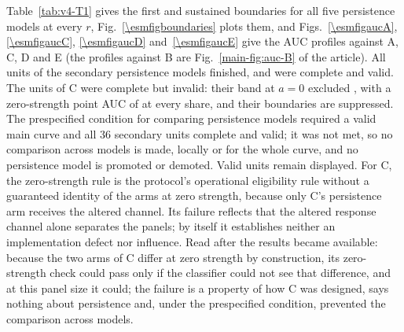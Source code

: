Table~\ref{tab:v4-T1} gives the first and sustained boundaries for all five persistence models at every $r$, Fig.~\ref{\esmfigboundaries} plots them, and Figs.~\ref{\esmfigaucA}, \ref{\esmfigaucC}, \ref{\esmfigaucD} and~\ref{\esmfigaucE} give the AUC profiles against A, C, D and E (the profiles against B are Fig.~\ref{main-fig:auc-B} of the article).
All  units of the secondary persistence models finished, and  were complete and valid. The  units of C were complete but invalid: their band at $a=0$ excluded , with a zero-strength point AUC of  at every share, and their boundaries are suppressed. The prespecified condition for comparing persistence models required a valid main curve and all 36 secondary units complete and valid; it was not met, so no comparison across models is made, locally or for the whole curve, and no persistence model is promoted or demoted. Valid units remain displayed.
For C, the zero-strength rule is the protocol's operational eligibility rule without a guaranteed identity of the arms at zero strength, because only C's persistence arm receives the altered channel. Its failure reflects that the altered response channel alone separates the panels; by itself it establishes neither an implementation defect nor influence. Read after the results became available: because the two arms of C differ at zero strength by construction, its zero-strength check could pass only if the classifier could not see that difference, and at this panel size it could; the failure is a property of how C was designed, says nothing about persistence and, under the prespecified condition, prevented the comparison across models.
